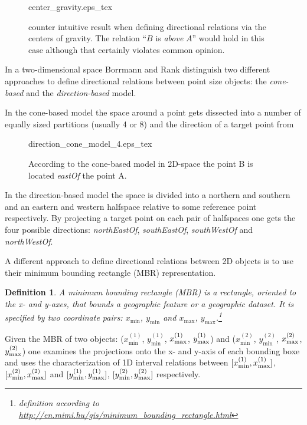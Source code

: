 \documentclass[paper=a4, fontsize=11pt]{scrartcl} %
\numberwithin{equation}{section} %
\numberwithin{figure}{section} %
\numberwithin{table}{section} %
\newtheorem{mydef}{Definition}
\begin{document}
\begin{figure}
  \centering
  \def\svgwidth{10em}
  {center_gravity.eps_tex}
  \caption{counter intuitive result when defining directional relations via the centers of gravity. The relation ``$B$ is \emph{above} $A$'' would hold in this case although that certainly violates common opinion.  }
  \label{fig:center_gravity}
\end{figure}

In a two-dimensional space Borrmann and Rank \cite{Borrmann:2009:AEI} distinguish two different approaches to define directional relations between point size objects: the \textit{cone-based} and the \textit{direction-based} model. 

In the cone-based model the space around a point gets dissected into a number of equally sized partitions (usually 4 or 8) and the direction of a target point from 

\begin{figure}
  \centering
  \def\svgwidth{15em}
  {direction_cone_model_4.eps_tex}
  \caption{According to the cone-based model in 2D-space the point B is located \emph{eastOf} the point A.}
  \label{fig:direction_cone_model_4}
\end{figure}

In the direction-based model the space is divided into a northern and southern and an eastern and western halfspace relative to some reference point respectively. By projecting a target point on each pair of halfspaces one gets the four possible directions: \emph{northEastOf}, \emph{southEastOf}, \emph{southWestOf} and \emph{northWestOf}. 

A different approach to define directional relations between 2D objects is to use their minimum bounding rectangle (MBR) representation.

\begin{mydef}
  A minimum bounding rectangle (MBR) is a rectangle, oriented to the x- and y-axes, that bounds a geographic feature or a geographic dataset. It is specified by two coordinate pairs: $x_{\mathrm{min}}$, $y_{\mathrm{min}}$ and $x_{\mathrm{max}}$, $y_{\mathrm{max}}$.\footnote{definition according to \url{http://en.mimi.hu/gis/minimum_bounding_rectangle.html}}
\end{mydef}

Given the MBR of two objects: ($x^{(1)}_{\mathrm{min}}$, $y^{(1)}_{\mathrm{min}}$, $x^{(1)}_{\vphantom{\mathrm{i}}\mathrm{max}}$, $y^{(1)}_{\vphantom{\mathrm{i}}\mathrm{max}}$) and ($x^{(2)}_{\mathrm{min}}$, $y^{(2)}_{\mathrm{min}}$, $x^{(2)}_{\vphantom{\mathrm{i}}\mathrm{max}}$, $y^{(2)}_{\vphantom{\mathrm{i}}\mathrm{max}}$) one examines the projections onto the x- and y-axis of each bounding boxe and uses the characterization of 1D interval relations between $[x^{(1)}_{\mathrm{min}}, x^{(1)}_{\vphantom{\mathrm{i}}\mathrm{max}}]$, $[x^{(2)}_{\mathrm{min}}, x^{(2)}_{\vphantom{\mathrm{i}}\mathrm{max}}]$ and $[y^{(1)}_{\mathrm{min}}, y^{(1)}_{\vphantom{\mathrm{i}}\mathrm{max}}]$, $[y^{(2)}_{\mathrm{min}}, y^{(2)}_{\vphantom{\mathrm{i}}\mathrm{max}}]$ respectively. 
\end{document}
